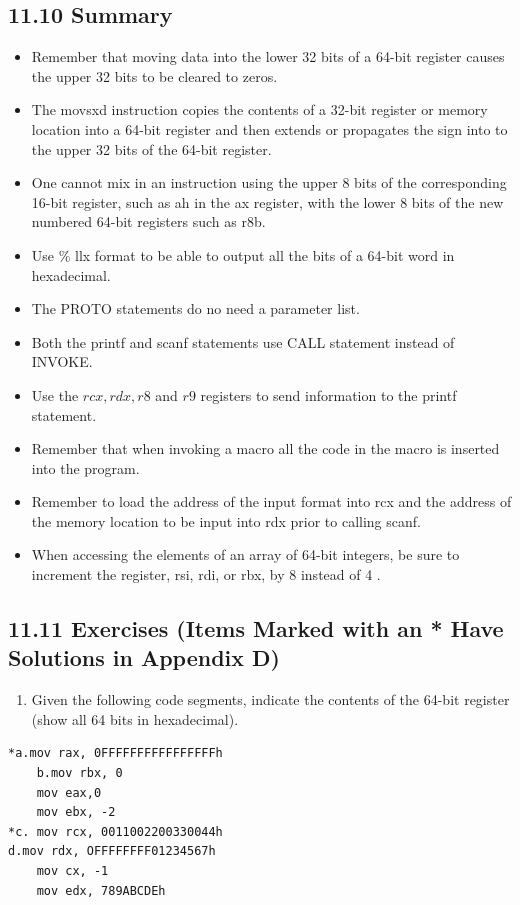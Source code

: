 \documentclass[10pt]{book}
\begin{document}
\subsection*{11.10 Summary}
\begin{itemize}
  \item Remember that moving data into the lower 32 bits of a 64-bit register causes the upper 32 bits to be cleared to zeros.
  \item The movsxd instruction copies the contents of a 32-bit register or memory location into a 64-bit register and then extends or propagates the sign into to the upper 32 bits of the 64-bit register.
  \item One cannot mix in an instruction using the upper 8 bits of the corresponding 16-bit register, such as ah in the ax register, with the lower 8 bits of the new numbered 64-bit registers such as r8b.
  \item Use \% llx format to be able to output all the bits of a 64-bit word in hexadecimal.
  \item The PROTO statements do no need a parameter list.
  \item Both the printf and scanf statements use CALL statement instead of INVOKE.
  \item Use the $r c x, r d x, r 8$ and $r 9$ registers to send information to the printf statement.
  \item Remember that when invoking a macro all the code in the macro is inserted into the program.
  \item Remember to load the address of the input format into rcx and the address of the memory location to be input into rdx prior to calling scanf.
  \item When accessing the elements of an array of 64-bit integers, be sure to increment the register, rsi, rdi, or rbx, by 8 instead of 4 .
\end{itemize}

\subsection*{11.11 Exercises (Items Marked with an * Have Solutions in Appendix D)}
\begin{enumerate}
  \item Given the following code segments, indicate the contents of the 64-bit register (show all 64 bits in hexadecimal).
\end{enumerate}


\begin{verbatim}
*a.mov rax, 0FFFFFFFFFFFFFFFFh
    b.mov rbx, 0
    mov eax,0
    mov ebx, -2
*c. mov rcx, 0011002200330044h
d.mov rdx, OFFFFFFFF01234567h
    mov cx, -1
    mov edx, 789ABCDEh
\end{verbatim}
\end{document}
